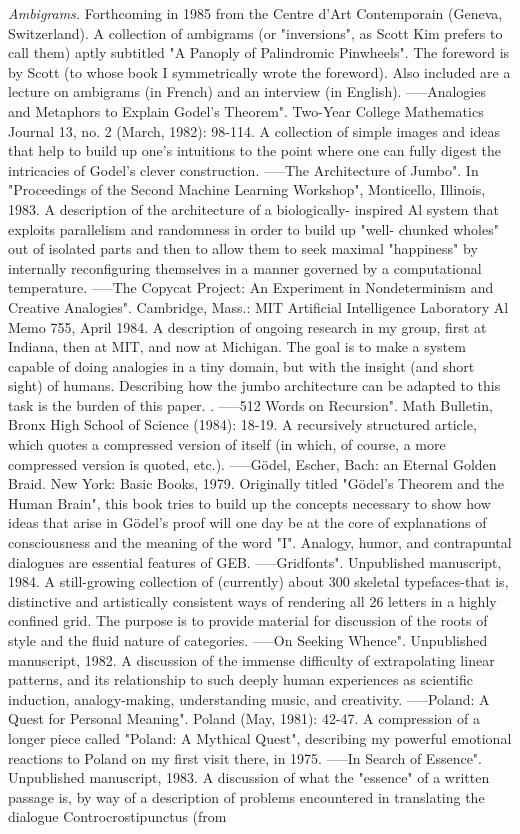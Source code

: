 {\sl Ambigrams.} Forthcoming in 1985 from the Centre d'Art Contemporain (Geneva, Switzerland). A collection of ambigrams (or "inversions", as Scott Kim prefers to call them) aptly subtitled "A Panoply of Palindromic Pinwheels". The foreword is by Scott (to whose book I symmetrically wrote the foreword). Also included are a lecture on ambigrams (in French) and an interview (in English). -----Analogies and Metaphors to Explain Godel's Theorem". Two-Year College Mathematics Journal 13, no. 2 (March, 1982): 98-114. A collection of simple images and ideas that help to build up one's intuitions to the point where one can fully digest the intricacies of Godel's clever construction. -----The Architecture of Jumbo". In "Proceedings of the Second Machine Learning Workshop", Monticello, Illinois, 1983. A description of the architecture of a biologically- inspired Al system that exploits parallelism and randomness in order to build up "well- chunked wholes" out of isolated parts and then to allow them to seek maximal "happiness" by internally reconfiguring themselves in a manner governed by a computational temperature. -----The Copycat Project: An Experiment in Nondeterminism and Creative Analogies". Cambridge, Mass.: MIT Artificial Intelligence Laboratory Al Memo 755, April 1984. A description of ongoing research in my group, first at Indiana, then at MIT, and now at Michigan. The goal is to make a system capable of doing analogies in a tiny domain, but with the insight (and short sight) of humans. Describing how the jumbo architecture can be adapted to this task is the burden of this paper. . -----512 Words on Recursion". Math Bulletin, Bronx High School of Science (1984): 18-19. A recursively structured article, which quotes a compressed version of itself (in which, of course, a more compressed version is quoted, etc.). -----Gödel, Escher, Bach: an Eternal Golden Braid. New York: Basic Books, 1979. Originally titled "Gödel’s Theorem and the Human Brain", this book tries to build up the concepts necessary to show how ideas that arise in Gödel’s proof will one day be at the core of explanations of consciousness and the meaning of the word "I". Analogy, humor, and contrapuntal dialogues are essential features of GEB. -----Gridfonts". Unpublished manuscript, 1984. A still-growing collection of (currently) about 300 skeletal typefaces-that is, distinctive and artistically consistent ways of rendering all 26 letters in a highly confined grid. The purpose is to provide material for discussion of the roots of style and the fluid nature of categories. -----On Seeking Whence". Unpublished manuscript, 1982. A discussion of the immense difficulty of extrapolating linear patterns, and its relationship to such deeply human experiences as scientific induction, analogy-making, understanding music, and creativity. -----Poland: A Quest for Personal Meaning". Poland (May, 1981): 42-47. A compression of a longer piece called "Poland: A Mythical Quest", describing my powerful emotional reactions to Poland on my first visit there, in 1975. -----In Search of Essence". Unpublished manuscript, 1983. A discussion of what the "essence" of a written passage is, by way of a description of problems encountered in translating the dialogue Controcrostipunctus (from 